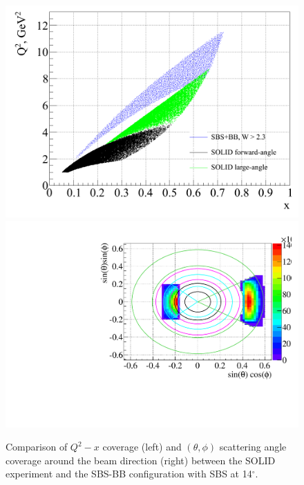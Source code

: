 \begin{figure}[h]
  \begin{center}
    \includegraphics[width=.48\textwidth]{figures/SBS_SOLID_phasecomp_W23.png}
    \includegraphics[width=.48\textwidth]{figures/SBS_SOLID_thetaphicomp.pdf}
  \end{center}
  \caption{\label{SBS_SOLID_phasespace_Comparison} Comparison of $Q^2-x$ coverage (left) and $(\theta,\phi)$ scattering angle coverage around the beam direction (right) between the SOLID experiment and the SBS-BB configuration with SBS at 14$^\circ$.}
\end{figure}
